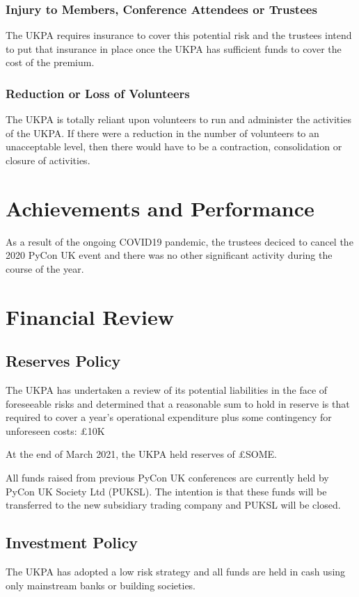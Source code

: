\documentclass[11pt, final]{article}
\begin{document}
            \subsubsection{Injury to Members, Conference Attendees or Trustees}
            The UKPA requires insurance to cover this potential risk and the trustees intend to put that insurance in place once the UKPA has sufficient funds to cover the cost of the premium.

            \subsubsection{Reduction or Loss of Volunteers}
            The UKPA is totally reliant upon volunteers to run and administer the activities of the UKPA. If there were a reduction in the number of volunteers to an unacceptable level, then there would have to be a contraction, consolidation or closure of activities.

    \section{Achievements and Performance}
    	As a result of the ongoing COVID19 pandemic, the trustees deciced to cancel the 2020 PyCon UK event and there was no other significant activity during the course of the year.
    \section{Financial Review}

        \subsection{Reserves Policy}
		The UKPA has undertaken a review of its potential liabilities in the face of foreseeable risks and determined that a reasonable sum to hold in reserve is that required to cover a year's operational expenditure plus some contingency for unforeseen costs: \pounds10K

        At the end of March 2021, the UKPA held reserves of \pounds SOME.

        All funds raised from previous PyCon UK conferences are currently held by PyCon UK Society Ltd (PUKSL). The intention is that these funds will be transferred to the new subsidiary trading company  and PUKSL will be closed.

        \subsection{Investment Policy}
        The UKPA has adopted a low risk strategy and all funds are held in cash using only mainstream banks or building societies.
\end{document}
